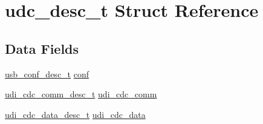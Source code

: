 \hypertarget{structudc__desc__t}{
\section{udc\-\_\-desc\-\_\-t \-Struct \-Reference}
\label{structudc__desc__t}
}
\subsection*{\-Data \-Fields}
\begin{DoxyCompactItemize}
\item 
\hyperlink{structusb__conf__desc__t}{usb\-\_\-conf\-\_\-desc\-\_\-t} \hyperlink{structudc__desc__t_ad10c40160370f9b60fe6ae7a2b9343e4}{conf}
\item 
\hyperlink{structudi__cdc__comm__desc__t}{udi\-\_\-cdc\-\_\-comm\-\_\-desc\-\_\-t} \hyperlink{structudc__desc__t_a6c35719c554e3b95bc117b00b4bc4277}{udi\-\_\-cdc\-\_\-comm}
\item 
\hyperlink{structudi__cdc__data__desc__t}{udi\-\_\-cdc\-\_\-data\-\_\-desc\-\_\-t} \hyperlink{structudc__desc__t_a67fedcdbe3d977511fa64bfab415c15f}{udi\-\_\-cdc\-\_\-data}
\end{DoxyCompactItemize}


